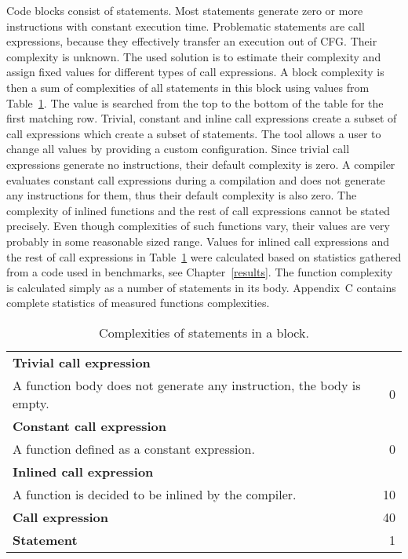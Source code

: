 Code blocks consist of statements. Most statements generate zero or more instructions with constant execution time. Problematic statements are call expressions, because they effectively transfer an execution out of CFG. Their complexity is unknown. The used solution is to estimate their complexity and assign fixed values for different types of call expressions. A block complexity is then a sum of complexities of all statements in this block using values from Table~\ref{yield-block}. The value is searched from the top to the bottom of the table for the first matching row. Trivial, constant and inline call expressions create a subset of call expressions which create a subset of statements. The tool allows a user to change all values by providing a custom configuration. Since trivial call expressions generate no instructions, their default complexity is zero. A compiler evaluates constant call expressions during a compilation and does not generate any instructions for them, thus their default complexity is also zero. The complexity of inlined functions and the rest of call expressions cannot be stated precisely. Even though complexities of such functions vary, their values are very probably in some reasonable sized range. Values for inlined call expressions and the rest of call expressions in Table~\ref{yield-block} were calculated based on statistics gathered from a code used in benchmarks, see Chapter~\ref{results}. The function complexity is calculated simply as a number of statements in its body. Appendix~C contains complete statistics of measured functions complexities.

\begin{table}[h!]
\caption{Complexities of statements in a block.}
\label{yield-block}
\vspace{0.1cm}
\renewcommand{\arraystretch}{1.1}
\centering
\begin{tabular}{ l r }
  \textbf{Trivial call expression}\\A function body does not generate any instruction, the body is empty. & 0 \\
  \textbf{Constant call expression}\\A function defined as a constant expression. & 0 \\
  \textbf{Inlined call expression}\\A function is decided to be inlined by the compiler. & 10 \\
  \cellcolor[gray]{0.9}\textbf{Call expression} & \cellcolor[gray]{0.9}40 \\
  \cellcolor[gray]{0.75}\textbf{Statement} & \cellcolor[gray]{0.75}1 \\
\end{tabular}
\end{table}

